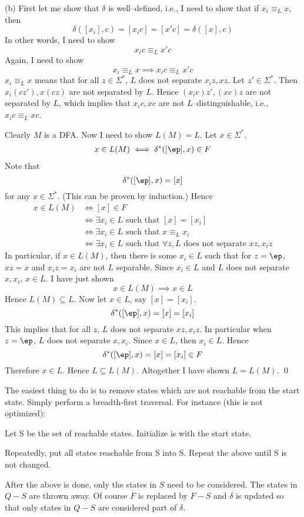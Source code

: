 (b)
First let me show that $\delta$ is well--defined, i.e.,
I need to show that if $x_i \equiv_L x$, then
\[
\delta([x_i], c) = [x_i c] = [x'c] = \delta([x], c)
\]
In other words, I need to show
\[
  x_i c \equiv_L x'c
\]
Again, I need to show
\[
x_i \equiv_L x \implies x_i c \equiv_L x'c 
\]
$x_i \equiv_L x$ means that for all $z \in \Sigma^*$,
$L$ does not separate $x_iz, xz$.
Let $z' \in \Sigma^*$.
Then $x_i(cz'), x(cz)$ are not separated by $L$.
Hence $(x_ic)z', (xc)z$ are not separated by $L$,
which implies that $x_ic, xc$ are not $L$--distinguishable, i.e.,
$x_ic \equiv_L xc$.

Clearly $M$ is a DFA.
Now I need to show $L(M) = L$.
Let $x \in \Sigma^*$.
\begin{align*}
  x \in L(M) \iff \delta^*([\ep], x) \in F
\end{align*}
Note that
\[
\delta^*([\ep], x) = [x]
\]
for any $x \in \Sigma^*$. (This can be proven by induction.)
Hence
\begin{align*}
  x \in L(M)
  &\iff [x] \in F \\
  &\iff \exists x_i \in L \text{ such that } [x] = [x_i] \\
  &\iff \exists x_i \in L \text{ such that } x \equiv_L x_i \\
  &\iff \exists x_i \in L \text{ such that } \forall z,
  L \text{ does not separate }
  xz, x_iz 
\end{align*}
In particular, if $x \in L(M)$, then
there is some $x_i \in L$ such that for $z = \ep$,
$xz=x$ and $x_iz=x_i$ are not $L$ separable.
Since $x_i \in L$ and $L$ does not separate $x,x_i$, $x \in L$.
I have just shown
\[
x \in L(M) \implies x \in L
\]
Hence $L(M) \subseteq L$.
Now let $x \in L$, say $[x] = [x_i]$.
\[
\delta^*([\ep], x) = [x] = [x_i] 
\]
This implies that for all $z$, $L$ does not separate
$xz,x_iz$.
In particular when $z = \ep$,
$L$ does not separate
$x,x_i$.
Since $x \in L$, then $x_i \in L$.
Hence
\[
\delta^*([\ep], x) = [x] = [x_i] \in F
\]
Therefore $x \in L$. Hence $L \subseteq L(M)$.
Altogether I have shown $L = L(M)$.
\qed


The easiest thing to do is to remove states which are not
reachable from the start state.
Simply perform a breadth-first traversal.
For instance (this is not optimized):
\begin{console}
Let S be the set of reachable states. Initialize is with the start state.

Repeatedly, put all states reachable from S into S.
Repeat the above until S is not changed.
\end{console}
After the above is done, only the states in $S$ need to be
considered.
The states in $Q - S$ are thrown away.
Of course $F$ is replaced by $F - S$ and $\delta$ is
updated so that only states in $Q - S$ are considered part of $\delta$.

